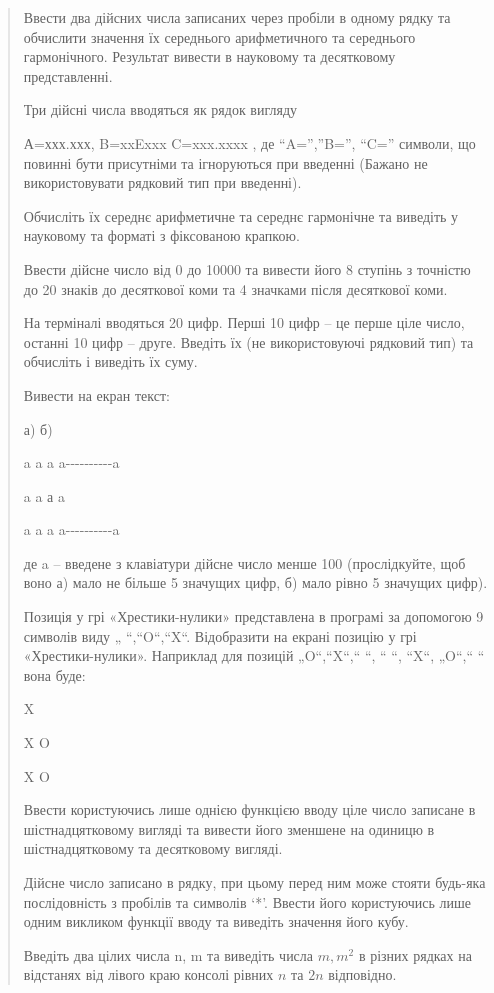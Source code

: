 \documentclass[]{article}
\begin{document}
\begin{quote}
Ввести два дійсних числа записаних через пробіли в одному рядку та
обчислити значення їх середнього арифметичного та середнього
гармонічного. Результат вивести в науковому та десятковому
представленні.

Три дійсні числа вводяться як рядок вигляду

А=ххх.ххх, B=xxExxx C=xxx.xxxx , де ``A='',''B='', ``C='' символи, що
повинні бути присутніми та ігноруються при введенні (Бажано не
використовувати рядковий тип при введенні).

Обчисліть їх середнє арифметичне та середнє гармонічне та виведіть у
науковому та форматі з фіксованою крапкою.

Ввести дійсне число від 0 до 10000 та вивести його 8 ступінь з точністю
до 20 знаків до десяткової коми та 4 значками після десяткової коми.

На терміналі вводяться 20 цифр. Перші 10 цифр -- це перше ціле число,
останні 10 цифр -- друге. Введіть їх (не використовуючі рядковий тип) та
обчисліть і виведіть їх суму.

Вивести на екран текст:

а) б)

a a a a-\/-\/-\/-\/-\/-\/-\/-\/-\/-a

a a а \textbar{} a \textbar{}

a a a a-\/-\/-\/-\/-\/-\/-\/-\/-\/-a

де a -- введене з клавіатури дійсне число менше 100 (прослідкуйте, щоб
воно а) мало не більше 5 значущих цифр, б) мало рівно 5 значущих цифр).

Позиція у грі «Хрестики-нулики» представлена в програмі за допомогою 9
символів виду „ ``,``O``,``X``. Відобразити на екрані позицію у грі
«Хрестики-нулики». Наприклад для позицій „O``,``X``,`` ``, `` ``, ``X``,
„O``,`` `` вона буде:

\textbar{} X \textbar{}

\textbar{} X \textbar{} O

X \textbar{} O \textbar{}

Ввести користуючись лише однією функцією вводу ціле число записане в
шістнадцятковому вигляді та вивести його зменшене на одиницю в
шістнадцятковому та десятковому вигляді.

Дійсне число записано в рядку, при цьому перед ним може стояти будь-яка
послідовність з пробілів та символів `*'. Ввести його користуючись лише
одним викликом функції вводу та виведіть значення його кубу.

Введіть два цілих числа n, m та виведіть числа \(m,m^{2}\) в різних
рядках на відстанях від лівого краю консолі рівних \(n\) та \(2n\)
відповідно.


\end{quote}
\end{document}
